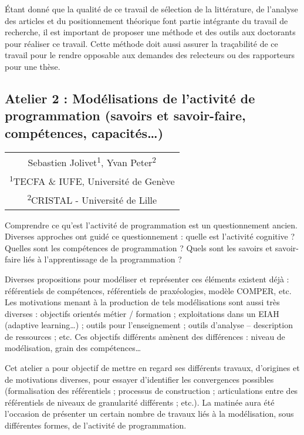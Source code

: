Étant donné que la qualité de ce travail de sélection de la littérature, de l’analyse des articles et du positionnement théorique font partie intégrante du travail de recherche, il est important de proposer une méthode et des outils aux doctorants pour réaliser ce travail. Cette méthode doit aussi assurer la traçabilité de ce travail pour le rendre opposable aux demandes des relecteurs ou des rapporteurs pour une thèse.

\newpage

\vspace*{2em}
\begin{center}
	\subsection{Atelier 2 : Modélisations de l’activité de programmation (savoirs et savoir-faire, compétences, capacités…)}
\end{center}

\vspace{1em}
\begin{center}
	\begin{tabular}{@{}c@{}}
		Sebastien Jolivet\textsuperscript{1}, Yvan Peter\textsuperscript{2}\\
		\textsuperscript{1}TECFA \& IUFE, Université de Genève\\
		\textsuperscript{2}CRISTAL - Université de Lille
	\end{tabular}
\end{center}

\vspace{2em}

Comprendre ce qu’est l’activité de programmation est un questionnement ancien. Diverses approches ont guidé ce questionnement : quelle est l’activité cognitive ? Quelles sont les compétences de programmation ? Quels sont les savoirs et savoir-faire liés à l’apprentissage de la programmation ?

Diverses propositions pour modéliser et représenter ces éléments existent déjà : référentiels de compétences, référentiels de praxéologies, modèle COMPER, etc. Les motivations menant à la production de tels modélisations sont aussi très diverses : objectifs orientés métier / formation ; exploitations dans un EIAH (adaptive learning…) ; outils pour l’enseignement ; outils d’analyse – description de ressources ; etc. Ces objectifs différents amènent des différences : niveau de modélisation, grain des compétences…

Cet atelier a pour objectif de mettre en regard ses différents travaux, d’origines et de motivations diverses, pour essayer d’identifier les convergences possibles (formalisation des référentiels ; processus de construction ; articulations entre des référentiels de niveaux de granularité différents ; etc.). La matinée aura été l'occasion de présenter un certain nombre de travaux liés à la modélisation, sous différentes formes, de l'activité de programmation.

